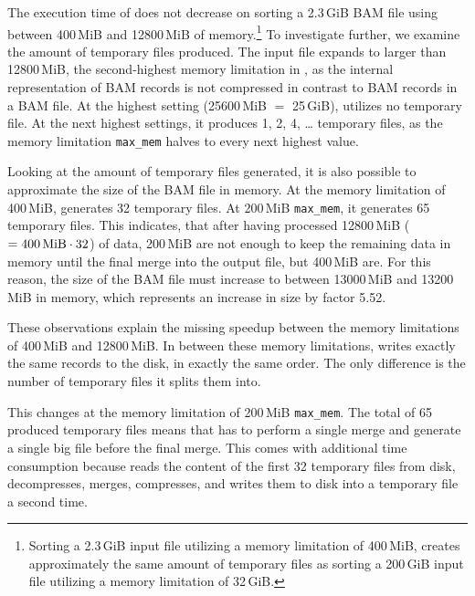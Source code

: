 The execution time of \sort does not decrease on sorting a 2.3\,GiB BAM file using between 400\,MiB and 12800\,MiB of memory.\footnote{Sorting a 2.3\,GiB input file utilizing a memory limitation of 400\,MiB, \sort creates approximately the same amount of temporary files as sorting a 200\,GiB input file utilizing a memory limitation of 32\,GiB.} To investigate further, we examine the amount of temporary files produced. The input file expands to larger than 12800\,MiB, the second-highest memory limitation in , as the internal representation of BAM records is not compressed in contrast to BAM records in a BAM file. At the highest setting (25600\,MiB $=$ 25\,GiB), \sort utilizes no temporary file. At the next highest settings, it produces 1, 2, 4, … temporary files, as the memory limitation \texttt{max\_mem} halves to every next highest value. 

Looking at the amount of temporary files generated, it is also possible to approximate the size of the BAM file in memory. At the memory limitation of 400\,MiB, \sort generates 32 temporary files. At 200\,MiB \texttt{max\_mem}, it generates 65 temporary files. This indicates, that after having processed 12800\,MiB ($= \text{400\,MiB} \cdot 32$) of data, 200\,MiB are not enough to keep the remaining data in memory until the final merge into the output file, but 400\,MiB are. \label{blowup}For this reason, the size of the BAM file must increase to between 13000\,MiB and 13200\,MiB in memory, which represents an increase in size by factor 5.52. 

These observations explain the missing speedup between the memory limitations of 400\,MiB and 12800\,MiB. In between these memory limitations, \sort writes exactly the same records to the disk, in exactly the same order. The only difference is the number of temporary files it splits them into. 

This changes at the memory limitation of 200\,MiB \texttt{max\_mem}. The total of 65 produced temporary files means that \sort has to perform a single merge and generate a single big file before the final merge. This comes with additional time consumption because \sort reads the content of the first 32 temporary files from disk, decompresses, merges, compresses, and writes them to disk into a temporary file a second time. 

